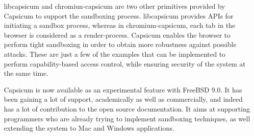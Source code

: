 libcapsicum and chromiun-capsicum are two other primitives provided by Capsicum to support the sandboxing process. libcapsicum provides APIs for initiating a sandbox process, whereas in chromium-capsicum, each tab in the browser is considered as a render-process. Capsicum enables the browser to perform tight sandboxing in order to obtain more robustness against possible attacks. These are just a few of the examples that can be implemented to perform capability-based access control, while ensuring security of the system at the same time.

Capsicum is now available as an experimental feature with FreeBSD 9.0. It has been gaining a lot of support, academically as well as commercially, and indeed has a lot of contribution to the open source documentation. It aims at supporting programmers who are already trying to implement sandboxing techniques, as well extending the system to Mac and Windows applications.